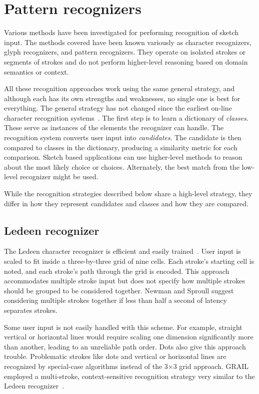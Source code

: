 \section{Pattern recognizers}
\label{sec:recognition-patterns}

Various methods have been investigated for performing recognition of
sketch input. The methods covered have been known variously as
character recognizers, glyph recognizers, and pattern
recognizers. They operate on isolated strokes or segments of strokes
and do not perform higher-level reasoning based on domain semantics or
context.

All these recognition approaches work using the same general strategy,
and although each has its own strengths and weaknesses, no single one
is best for everything. The general strategy has not changed since the
earliest on-line character recognition
systems~\cite{groner-grail-recognizer,newman-sproull-graphics-2}. The
first step is to learn a dictionary of \textit{classes}. These serve
as instances of the elements the recognizer can handle. The
recognition system converts user input into \textit{candidates}. The
candidate is then compared to classes in the dictionary, producing a
similarity metric for each comparison. Sketch based applications can
use higher-level methods to reason about the most likely choice or
choices. Alternately, the best match from the low-level recognizer
might be used.

While the recognition strategies described below share a high-level
strategy, they differ in how they represent candidates and classes and
how they are compared.

\subsection{Ledeen recognizer}

The Ledeen character recognizer is efficient and easily
trained~\cite{newman-sproull-graphics-2}. User input is scaled to fit
inside a three-by-three grid of nine cells. Each stroke's starting
cell is noted, and each stroke's path through the grid is
encoded. This approach accommodates multiple stroke input but does not
specify how multiple strokes should be grouped to be considered
together. Newman and Sproull suggest considering multiple strokes
together if less than half a second of latency separates strokes.

Some user input is not easily handled with this scheme. For example,
straight vertical or horizontal lines would require scaling one
dimension significantly more than another, leading to an unreliable
path order. Dots also give this approach trouble. Problematic strokes
like dots and vertical or horizontal lines are recognized by
special-case algorithms instead of the 3$\times$3 grid approach. GRAIL
employed a multi-stroke, context-sensitive recognition strategy very
similar to the Ledeen recognizer~\cite{groner-grail-recognizer}.

